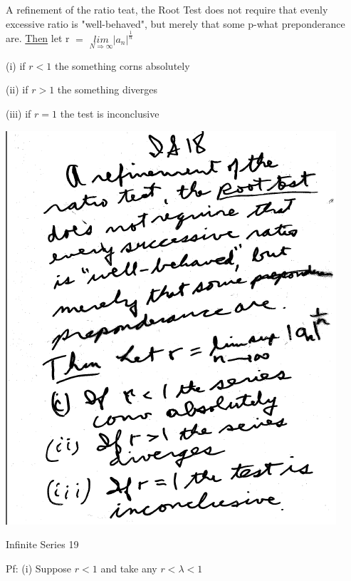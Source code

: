 \documentclass[10pt,a4paper]{article}
\begin{document}
{{\begin{center}
\end{center}

A refinement of the ratio teat, the Root Test does not 
require that evenly excessive ratio is "well-behaved", but merely that some p-what preponderance are.
{\underline {Then}} let r $=$ ${\underset{\text{$N\Rightarrow \infty$}}{lim}}|a_{n}|^\frac{1}{n}$

(i) if $r<1$ the something corns absolutely

(ii) if $r>1$ the something diverges

(iii) if $r=1$ the test is inconclusive

\begin{center}

\includegraphics[scale=.7]{Pages/IS_18}

\end{center}

\newpage %

\begin{center}

Infinite Series 19

\end{center}

Pf: (i) Suppose $r<1$ and take any $r<\lambda <1$

}}
\end{document}
